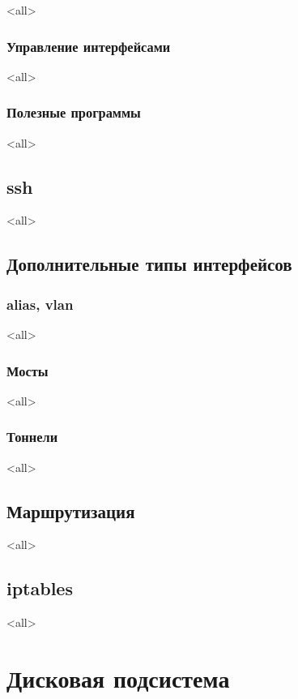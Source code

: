 \mode<all>{}

\subsection{Управление интерфейсами}
\mode<all>{}

\subsection{Полезные программы}
\mode<all>{}

\section{ssh}
\mode<all>{}


\section{Дополнительные типы интерфейсов}

\subsection{alias, vlan}
\mode<all>{}
\subsection{Мосты}
\mode<all>{}
\subsection{Тоннели}
\mode<all>{}

\section{Маршрутизация}
\mode<all>{}

\section{iptables}
\mode<all>{}

\chapter{Дисковая подсистема}

